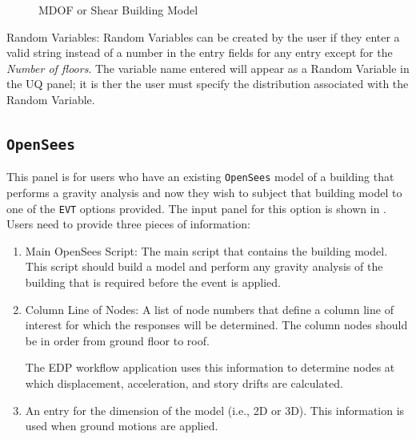 \begin{figure}[!htbp]
  \caption{MDOF or Shear Building Model}
  \label{fig:mdof}
\end{figure}

Random Variables: Random Variables can be created by the user if they enter
a valid string instead of a number in the entry fields for any entry
except for the \emph{Number of floors}. The variable name entered will appear as
a Random Variable in the UQ panel; it is ther the user must specify the distribution 
associated with the Random Variable.

\subsection{\texttt{OpenSees}}\label{sec:OpenSeesSIM}
This panel is for users who have an existing \texttt{OpenSees} model of a
building that performs a gravity analysis and now they wish to subject that
building model to one of the \texttt{EVT} options provided. The input panel
for this option is shown in . Users need to provide three pieces of information:
\begin{enumerate} 
\item Main OpenSees Script: The main script that contains the building
  model. This script should build a model and perform any gravity
  analysis of the building that is required before the event is
  applied.
\item Column Line of Nodes: A list of node numbers that define a column line of interest for which
  the responses will be determined. The column nodes should be in
  order from ground floor to roof. 
  
  The EDP workflow application uses this information to determine nodes at which
  displacement, acceleration, and story drifts are calculated.
\item An entry for the dimension of the model (i.e., 2D or 3D). This
  information is used when ground motions are applied.
\end{enumerate}

